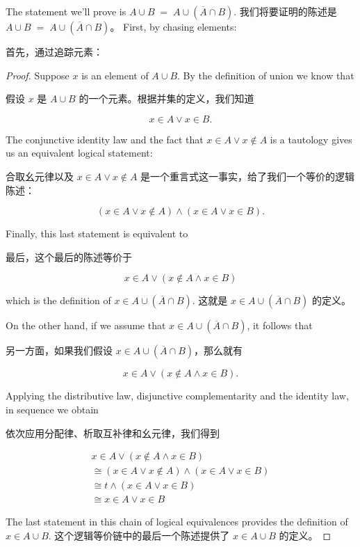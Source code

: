 The statement we'll prove is $A \cup B \; = \; A \cup (\overline{A} \cap B)$.
我们将要证明的陈述是 $A \cup B \; = \; A \cup (\overline{A} \cap B)$。
First, by chasing elements:

首先，通过追踪元素：

\begin{proof}
Suppose $x$ is an element of $A \cup B$.
By the definition of union we
know that 

假设 $x$ 是 $A \cup B$ 的一个元素。根据并集的定义，我们知道

\[ x \in A \lor x \in B. \]

The conjunctive identity law and the
fact that $x \in A \lor x \notin A$ is a tautology gives us an equivalent
logical statement:

合取幺元律以及 $x \in A \lor x \notin A$ 是一个重言式这一事实，给了我们一个等价的逻辑陈述：

\[ (x \in A \lor x \notin A) \land (x \in A \lor x \in B).
\]

Finally, this last statement is equivalent to

最后，这个最后的陈述等价于

\[ x \in A \lor (x \notin A \land x \in B) \]

\noindent which is the definition of $x \in A \cup (\overline{A} \cap B)$.
\noindent 这就是 $x \in A \cup (\overline{A} \cap B)$ 的定义。

On the other hand, if we assume that $x \in A \cup (\overline{A} \cap B)$, it follows that 

另一方面，如果我们假设 $x \in A \cup (\overline{A} \cap B)$，那么就有

\[ x \in A \lor (x \notin A \land x \in B).
\]

Applying the distributive law, disjunctive complementarity and the identity law,
in sequence we obtain

依次应用分配律、析取互补律和幺元律，我们得到

\begin{gather*} 
 x \in A \lor (x \notin A \land x \in B) \\
\cong (x \in A \lor x \notin A) \land (x \in A \lor x \in B) \\
\cong t \land (x \in A \lor x \in B) \\
\cong x \in A \lor x \in B
\end{gather*}

The last statement in this chain of logical equivalences provides the definition of $x \in A \cup B$.
这个逻辑等价链中的最后一个陈述提供了 $x \in A \cup B$ 的定义。
\end{proof}

